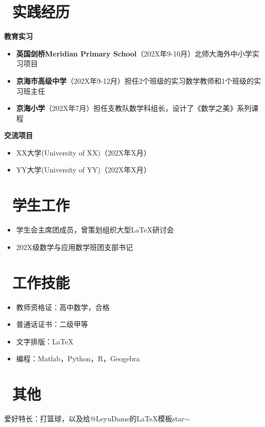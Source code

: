\documentclass[11pt]{article}
\begin{document}
\section{\makebox[\widthof{\faGraduationCap}][c]{\color{CVBlue}\faUniversity}\ 实践经历}
\textbf{教育实习}
\begin{itemize}
	\item \textbf{英国剑桥Meridian Primary School}（202X年9-10月）北师大海外中小学实习项目
	\item \textbf{京海市高级中学}（202X年9-12月）担任2个班级的实习数学教师和1个班级的实习班主任
	\item \textbf{京海小学}（202X年7月）担任支教队数学科组长，设计了《数学之美》系列课程
\end{itemize}

\textbf{交流项目}
\begin{itemize}
	\item XX大学(University of XX)（202X年X月）
	\item YY大学(University of YY)（202X年X月）
\end{itemize}

%
%

\section{\makebox[\widthof{\faGraduationCap}][c]{\color{CVBlue}\faUsers}\ 学生工作}
\begin{itemize}
	\item 学生会主席团成员，曾策划组织大型\LaTeX{}研讨会
	\item 202X级数学与应用数学班团支部书记
\end{itemize}

\section{\makebox[\widthof{\faGraduationCap}][c]{\color{CVBlue}\faWrench}\ 工作技能}

\begin{itemize}
	\item 教师资格证：高中数学，合格
	\item 普通话证书：二级甲等
	\item 文字排版：\LaTeX{}
	\item 编程：Matlab，Python，R，Geogebra

\end{itemize}

\section{\makebox[\widthof{\faGraduationCap}][c]{\color{CVBlue}\faTags}\ 其他}
爱好特长：打篮球，以及给@LeyuDame的\LaTeX{}模板star$\sim$

\end{document}
